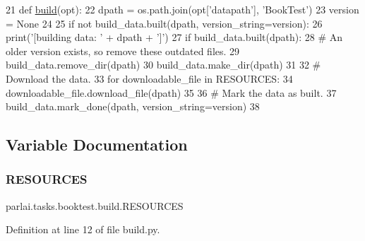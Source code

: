 \begin{DoxyCode}
21 \textcolor{keyword}{def }\hyperlink{namespacedialog__babi__feedback_1_1build_a7a9d289f7493a5ded13c4b7f071b6184}{build}(opt):
22     dpath = os.path.join(opt[\textcolor{stringliteral}{'datapath'}], \textcolor{stringliteral}{'BookTest'})
23     version = \textcolor{keywordtype}{None}
24 
25     \textcolor{keywordflow}{if} \textcolor{keywordflow}{not} build\_data.built(dpath, version\_string=version):
26         print(\textcolor{stringliteral}{'[building data: '} + dpath + \textcolor{stringliteral}{']'})
27         \textcolor{keywordflow}{if} build\_data.built(dpath):
28             \textcolor{comment}{# An older version exists, so remove these outdated files.}
29             build\_data.remove\_dir(dpath)
30         build\_data.make\_dir(dpath)
31 
32         \textcolor{comment}{# Download the data.}
33         \textcolor{keywordflow}{for} downloadable\_file \textcolor{keywordflow}{in} RESOURCES:
34             downloadable\_file.download\_file(dpath)
35 
36         \textcolor{comment}{# Mark the data as built.}
37         build\_data.mark\_done(dpath, version\_string=version)
38 \end{DoxyCode}


\subsection{Variable Documentation}
\mbox{\label{namespaceparlai_1_1tasks_1_1booktest_1_1build_a0168fbebb5389a8349a98a8f6e552e76}} 
\subsubsection{\texorpdfstring{R\+E\+S\+O\+U\+R\+C\+ES}{RESOURCES}}
{\footnotesize\ttfamily parlai.\+tasks.\+booktest.\+build.\+R\+E\+S\+O\+U\+R\+C\+ES}



Definition at line 12 of file build.\+py.

